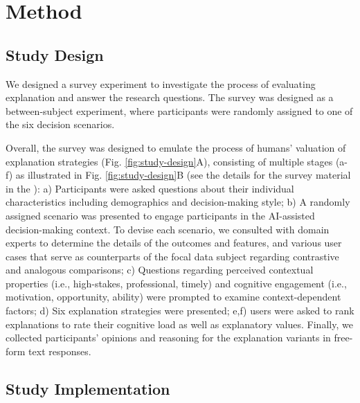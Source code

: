 \section{Method}\label{sec:method}

\subsection{Study Design}\label{sec:study-design}

We designed a survey experiment to investigate the process of evaluating explanation and answer the research questions. The survey was designed as a between-subject experiment, where participants were randomly assigned to one of the six decision scenarios.

Overall, the survey was designed to emulate the process of humans' valuation of explanation strategies (Fig. \ref{fig:study-design}A), consisting of multiple stages (a-f) as illustrated in Fig. \ref{fig:study-design}B (see the details for the survey material in the ): a) Participants were asked questions about their individual characteristics including demographics and decision-making style; b) A randomly assigned scenario was presented to engage participants in the AI-assisted decision-making context. To devise each scenario, we consulted with domain experts to determine the details of the outcomes and features, and various user cases that serve as counterparts of the focal data subject regarding contrastive and analogous comparisons; c) Questions regarding perceived contextual properties (i.e., high-stakes, professional, timely) and cognitive engagement (i.e., motivation, opportunity, ability) were prompted to examine context-dependent factors; d) Six explanation strategies were presented; e,f) users were asked to rank explanations to rate their cognitive load as well as explanatory values. Finally, we collected participants' opinions and reasoning for the explanation variants in free-form text responses.


\subsection{Study Implementation}
\label{sec:study-procedure}

